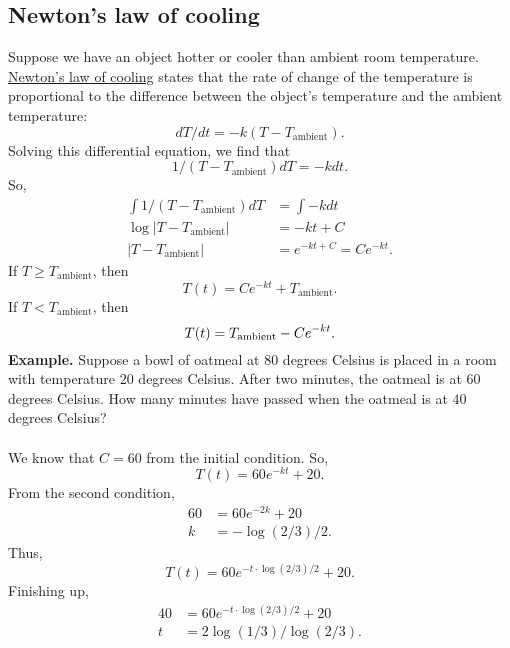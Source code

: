 \documentclass[11pt, oneside]{article}   	%
\begin{document}
\subsection{Newton's law of cooling}
Suppose we have an object hotter or cooler than ambient room temperature. \underline{Newton's law of cooling} states that the rate of change of the temperature is proportional to the difference between the object's temperature and the ambient temperature:
$$
dT/dt = -k(T - T_\textrm{ambient}).
$$
Solving this differential equation, we find that 
$$
1 / (T - T_\textrm{ambient}) dT = -k dt.
$$
So, 
\begin{align*}
\int 1 / (T - T_\textrm{ambient}) dT &= \int -k dt\\
\log |T - T_\textrm{ambient}| &= -kt + C\\
|T - T_\textrm{ambient}|&= e^{-kt + C} = Ce^{-kt}.
\end{align*}
If $T \geqslant T_\textrm{ambient}$, then
$$
T(t) = Ce^{-kt} + T_\textrm{ambient}.
$$
If $T < T_\textrm{ambient}$, then
$$
T(t) = T_\textrm{ambient} - Ce^{-kt}.\\\\
$$
\textbf{Example.} Suppose a bowl of oatmeal at $80$ degrees Celsius is placed in a room with temperature $20$ degrees Celsius. After two minutes, the oatmeal is at $60$ degrees Celsius. How many minutes have passed when the oatmeal is at $40$ degrees Celsius?\\\\
We know that $C = 60$ from the initial condition. So,
$$
T(t) = 60 e^{-kt} + 20.
$$
From the second condition,
\begin{align*}
60 &= 60e^{-2k} + 20\\
k &= -\log(2/3)/2.
\end{align*}
Thus,
$$
T(t) = 60 e^{-t \cdot \log(2/3)/2} + 20.
$$
Finishing up,
\begin{align*}
40 &=  60 e^{-t \cdot \log(2/3)/2} + 20 \\
t &= 2 \log(1/3)/\log(2/3).\\\\
\end{align*}
\end{document}
